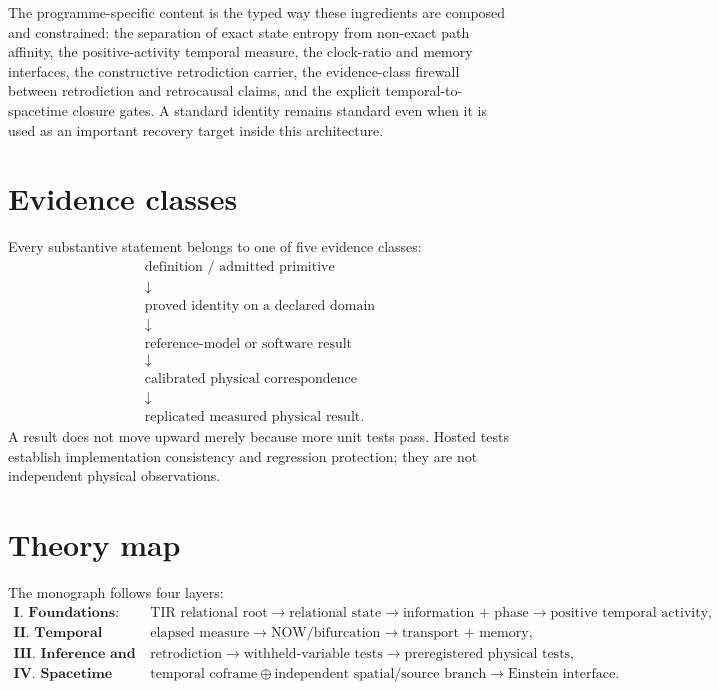 \documentclass[11pt]{book}
\begin{document}
The programme-specific content is the typed way these ingredients are composed and constrained: the separation of exact state entropy from non-exact path affinity, the positive-activity temporal measure, the clock-ratio and memory interfaces, the constructive retrodiction carrier, the evidence-class firewall between retrodiction and retrocausal claims, and the explicit temporal-to-spacetime closure gates. A standard identity remains standard even when it is used as an important recovery target inside this architecture.

\section*{Evidence classes}

Every substantive statement belongs to one of five evidence classes:
\[
\boxed{
\begin{array}{c}
\text{definition / admitted primitive}\\
\downarrow\\
\text{proved identity on a declared domain}\\
\downarrow\\
\text{reference-model or software result}\\
\downarrow\\
\text{calibrated physical correspondence}\\
\downarrow\\
\text{replicated measured physical result}.
\end{array}}
\]
A result does not move upward merely because more unit tests pass. Hosted tests establish implementation consistency and regression protection; they are not independent physical observations.

\section*{Theory map}

The monograph follows four layers:
\[
\boxed{
\begin{aligned}
\textbf{I. Foundations:}\quad&
\text{TIR relational root}
\to
\text{relational state}
\to
\text{information + phase}
\to
\text{positive temporal activity},
\\[1mm]
\textbf{II. Temporal dynamics:}\quad&
\text{elapsed measure}
\to
\text{NOW/bifurcation}
\to
\text{transport + memory},
\\[1mm]
\textbf{III. Inference and experiment:}\quad&
\text{retrodiction}
\to
\text{withheld-variable tests}
\to
\text{preregistered physical tests},
\\[1mm]
\textbf{IV. Spacetime closure:}\quad&
\text{temporal coframe}
\oplus
\text{independent spatial/source branch}
\to
\text{Einstein interface}.
\end{aligned}}
\]
\end{document}
